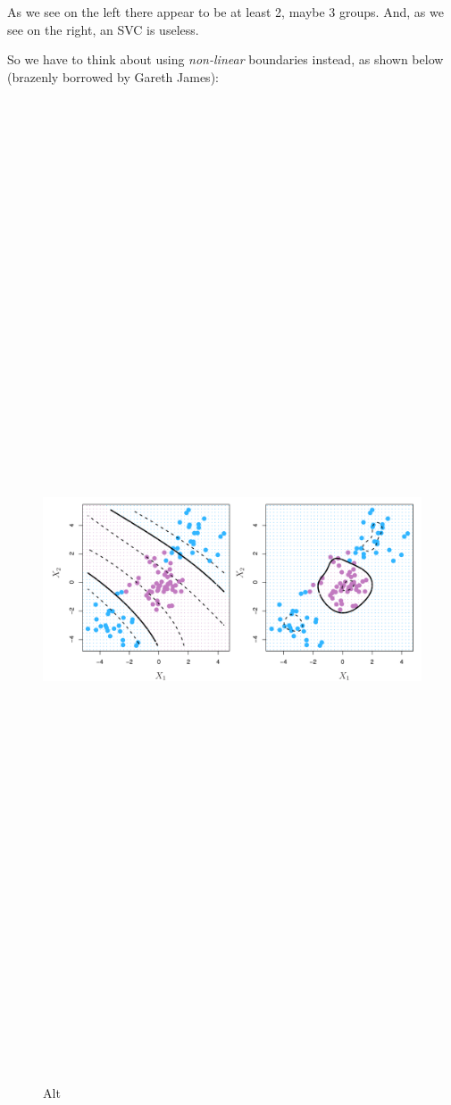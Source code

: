 \documentclass[
]{article}
\begin{document}
As we see on the left there appear to be at least 2, maybe 3 groups.
And, as we see on the right, an SVC is useless.

So we have to think about using \emph{non-linear} boundaries instead, as
shown below (brazenly borrowed by Gareth James):

\begin{figure}
\centering
\includegraphics[width=1\textwidth,height=12.5in]{9.9.pdf}
\caption{Alt}
\end{figure}
\end{document}
